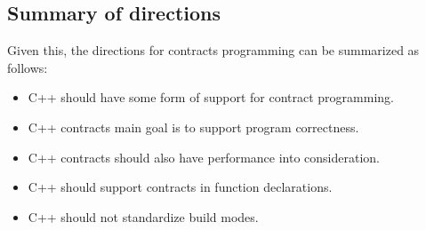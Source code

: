 
\subsection{Summary of directions}

Given this, the directions for contracts programming can be summarized as
follows:

\begin{itemize}
\item C++ should have some form of support for contract programming.
\item C++ contracts main goal is to support program correctness.
\item C++ contracts should also have performance into consideration.
\item C++ should support contracts in function declarations.
\item C++ should not standardize build modes.
\end{itemize}
